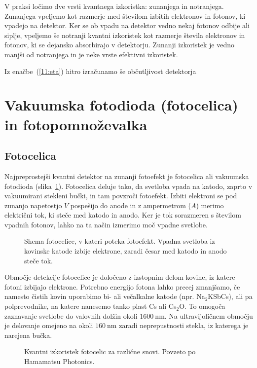 \begin{remark}
V praksi ločimo dve vrsti kvantnega izkoristka: zunanjega in notranjega. Zunanjega vpeljemo kot 
razmerje med številom izbitih elektronov in fotonov, ki vpadejo na detektor. Ker se 
ob vpadu na detektor vedno nekaj fotonov odbije ali siplje, vpeljemo še notranji kvantni 
izkoristek kot razmerje števila elektronov in fotonov, ki se dejansko absorbirajo v detektorju.
Zunanji izkoristek je vedno manjši od notranjega in je neke vrste efektivni 
izkoristek.
\end{remark}

Iz enačbe~(\ref{11:eta}) hitro izračunamo še občutljivost detektorja 

\section{Vakuumska fotodioda (fotocelica) in fotopomnoževalka}
\subsection*{Fotocelica}
Najpreprostejši kvantni detektor na zunanji fotoefekt je fotocelica ali vakuumska fotodioda
(slika~\ref{fig:Fotoefekt}). Fotocelica deluje tako, da svetloba vpada na katodo, 
zaprto v vakuumirani stekleni bučki, in tam povzroči fotoefekt. Izbiti elektroni 
se pod zunanjo napetostjo $V$ pospešijo do anode in z ampermetrom ($A$) 
merimo električni tok, ki steče med katodo in anodo. 
Ker je tok sorazmeren s številom vpadnih fotonov, lahko na ta 
način izmerimo moč vpadne svetlobe.

\begin{figure}[h]
\centering
\def\svgwidth{60truemm} 

\caption{Shema fotocelice, v kateri poteka fotoefekt. 
Vpadna svetloba iz kovinske katode izbije elektrone, zaradi česar med katodo 
in anodo steče tok.}
\label{fig:Fotoefekt}
\end{figure}

Območje detekcije fotocelice je določeno z izstopnim delom kovine, iz 
katere fotoni izbijajo elektrone. Potrebno energijo fotona lahko precej zmanjšamo, 
če namesto čistih kovin uporabimo bi- ali večalkalne katode 
(npr. Na$_2$KSbCs), ali pa polprevodnike, na katere nanesemo tanko plast 
Cs ali Cs$_2$O. To omogoča zaznavanje svetlobe do valovnih dolžin okoli $1600~\si{\nano\metre}$. 
Na ultravijoličnem območju je delovanje
omejeno na okoli $160~\si{\nano\metre}$ zaradi neprepustnosti stekla, 
iz katerega je narejena bučka.
\begin{figure}[h]
\centering
\def\svgwidth{130truemm} 

\caption{Kvantni izkoristek fotocelic za različne snovi. Povzeto po Hamamatsu Photonics.}
\label{fig:Fotodioda}
\end{figure}


